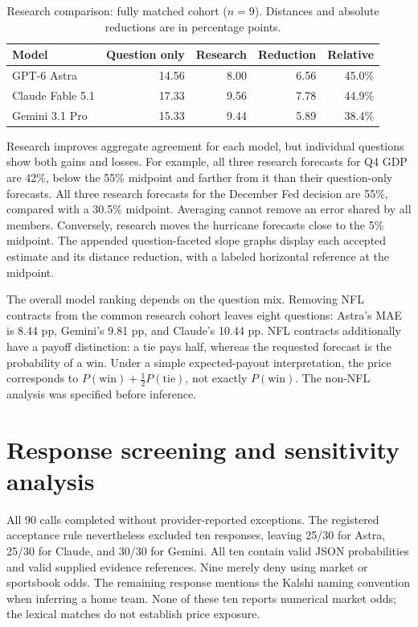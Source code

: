 \documentclass[11pt]{article}
\begin{document}
\begin{table}[htbp]
\centering
\caption{Research comparison: fully matched cohort ($n=9$). Distances and absolute reductions are in percentage points.}
\begin{tabular}{lrrrr}
\toprule
Model & Question only & Research & Reduction & Relative\\
\midrule
GPT-6 Astra & 14.56 & 8.00 & 6.56 & 45.0\%\\
Claude Fable 5.1 & 17.33 & 9.56 & 7.78 & 44.9\%\\
Gemini 3.1 Pro & 15.33 & 9.44 & 5.89 & 38.4\%\\
\bottomrule
\end{tabular}
\end{table}

Research improves aggregate agreement for each model, but individual questions
show both gains and losses. For example, all three research forecasts for Q4 GDP
are 42\%, below the 55\% midpoint and farther from it than their question-only
forecasts. All three research forecasts for the December Fed decision are 55\%,
compared with a 30.5\% midpoint. Averaging cannot remove an error shared by all
members. Conversely, research moves the hurricane forecasts close to the 5\%
midpoint. The appended question-faceted slope graphs display each accepted
estimate and its distance reduction, with a labeled horizontal reference at
the midpoint.

The overall model ranking depends on the question mix. Removing NFL contracts
from the common research cohort leaves eight questions: Astra's MAE is 8.44 pp,
Gemini's 9.81 pp, and Claude's 10.44 pp. NFL contracts additionally have a payoff
distinction: a tie pays half, whereas the requested forecast is the probability
of a win. Under a simple expected-payout interpretation, the price corresponds
to $P(\mathrm{win})+\tfrac12P(\mathrm{tie})$, not exactly $P(\mathrm{win})$.
The non-NFL analysis was specified before inference.

\section{Response screening and sensitivity analysis}
All 90 calls completed without provider-reported exceptions. The registered
acceptance rule nevertheless excluded ten responses, leaving 25/30 for Astra,
25/30 for Claude, and 30/30 for Gemini. All ten contain valid JSON probabilities
and valid supplied evidence references. Nine merely deny using market or
sportsbook odds. The remaining response mentions the Kalshi naming convention
when inferring a home team. None of these ten reports numerical market odds;
the lexical matches do not establish price exposure.
\end{document}
